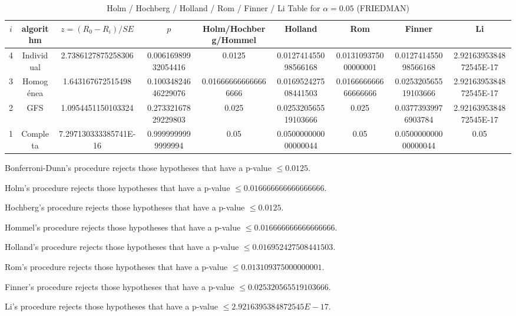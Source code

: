 \documentclass[a4paper,10pt]{article}
\begin{document}
\begin{landscape}
\begin{table}[!htp]
\centering\scriptsize
\caption{Holm / Hochberg / Holland / Rom / Finner / Li Table for $\alpha=0.05$ (FRIEDMAN)}
\begin{tabular}{ccccccccc}
$i$&algorithm&$z=(R_0 - R_i)/SE$&$p$&Holm/Hochberg/Hommel&Holland&Rom&Finner&Li\\
\hline
4&Individual&2.7386127875258306&0.00616989932054416&0.0125&0.012741455098566168&0.013109375000000001&0.012741455098566168&2.9216395384872545E-17\\
3&Homogénea&1.643167672515498&0.10034824646229076&0.016666666666666666&0.016952427508441503&0.016666666666666666&0.025320565519103666&2.9216395384872545E-17\\
2&GFS&1.0954451150103324&0.27332167829229803&0.025&0.025320565519103666&0.025&0.03773939976903784&2.9216395384872545E-17\\
1&Completa&7.297130333385741E-16&0.9999999999999994&0.05&0.050000000000000044&0.05&0.050000000000000044&0.05\\
\hline
\end{tabular}
\end{table}
Bonferroni-Dunn's procedure rejects those hypotheses that have a p-value $\le0.0125$.


Holm's procedure rejects those hypotheses that have a p-value $\le0.016666666666666666$.


Hochberg's procedure rejects those hypotheses that have a p-value $\le0.0125$.


Hommel's procedure rejects those hypotheses that have a p-value $\le0.016666666666666666$.


Holland's procedure rejects those hypotheses that have a p-value $\le0.016952427508441503$.


Rom's procedure rejects those hypotheses that have a p-value $\le0.013109375000000001$.


Finner's procedure rejects those hypotheses that have a p-value $\le0.025320565519103666$.


Li's procedure rejects those hypotheses that have a p-value $\le2.9216395384872545E-17$.



\newpage


\end{landscape}
\end{document}
